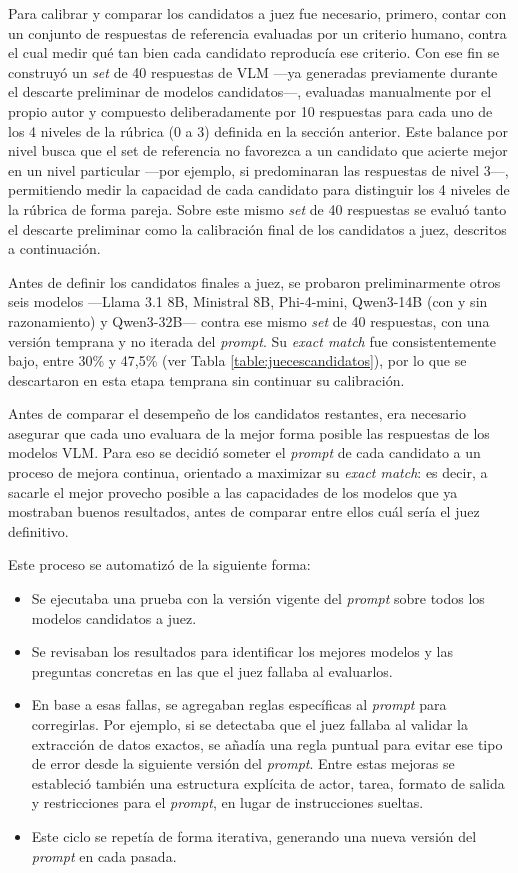Para calibrar y comparar los candidatos a juez fue necesario, primero, contar con un conjunto de respuestas de referencia evaluadas por un criterio humano, contra el cual medir qué tan bien cada candidato reproducía ese criterio. Con ese fin se construyó un \textit{set} de 40 respuestas de VLM —ya generadas previamente durante el descarte preliminar de modelos candidatos—, evaluadas manualmente por el propio autor y compuesto deliberadamente por 10 respuestas para cada uno de los 4 niveles de la rúbrica (0 a 3) definida en la sección anterior. Este balance por nivel busca que el set de referencia no favorezca a un candidato que acierte mejor en un nivel particular —por ejemplo, si predominaran las respuestas de nivel 3—, permitiendo medir la capacidad de cada candidato para distinguir los 4 niveles de la rúbrica de forma pareja. Sobre este mismo \textit{set} de 40 respuestas se evaluó tanto el descarte preliminar como la calibración final de los candidatos a juez, descritos a continuación.

Antes de definir los candidatos finales a juez, se probaron preliminarmente otros seis modelos —Llama 3.1 8B, Ministral 8B, Phi-4-mini, Qwen3-14B (con y sin razonamiento) y Qwen3-32B— contra ese mismo \textit{set} de 40 respuestas, con una versión temprana y no iterada del \textit{prompt}. Su \textit{exact match} fue consistentemente bajo, entre 30\% y 47,5\% (ver Tabla \ref{table:juecescandidatos}), por lo que se descartaron en esta etapa temprana sin continuar su calibración.

Antes de comparar el desempeño de los candidatos restantes, era necesario asegurar que cada uno evaluara de la mejor forma posible las respuestas de los modelos VLM. Para eso se decidió someter el \textit{prompt} de cada candidato a un proceso de mejora continua, orientado a maximizar su \textit{exact match}: es decir, a sacarle el mejor provecho posible a las capacidades de los modelos que ya mostraban buenos resultados, antes de comparar entre ellos cuál sería el juez definitivo.

Este proceso se automatizó de la siguiente forma:

\begin{itemize}
    \item Se ejecutaba una prueba con la versión vigente del \textit{prompt} sobre todos los modelos candidatos a juez.
    \item Se revisaban los resultados para identificar los mejores modelos y las preguntas concretas en las que el juez fallaba al evaluarlos.
    \item En base a esas fallas, se agregaban reglas específicas al \textit{prompt} para corregirlas. Por ejemplo, si se detectaba que el juez fallaba al validar la extracción de datos exactos, se añadía una regla puntual para evitar ese tipo de error desde la siguiente versión del \textit{prompt}. Entre estas mejoras se estableció también una estructura explícita de actor, tarea, formato de salida y restricciones para el \textit{prompt}, en lugar de instrucciones sueltas.
    \item Este ciclo se repetía de forma iterativa, generando una nueva versión del \textit{prompt} en cada pasada.
\end{itemize}

